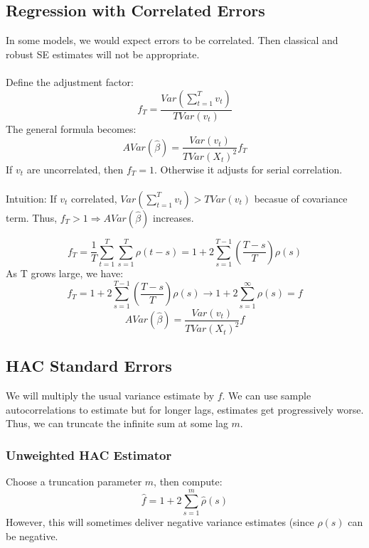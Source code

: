\documentclass{article}
\begin{document}
\subsection{Regression with Correlated Errors}
In some models, we would expect errors to be correlated. Then classical and robust SE estimates will not be appropriate.\\
\\
Define the adjustment factor:
$$f_T = \frac{Var(\sum_{t=1}^T v_t)}{TVar(v_t)}$$
The general formula becomes:
$$AVar(\hat{\beta}) = \frac{Var(v_t)}{TVar(X_t)^2}f_T$$
If $v_t$ are uncorrelated, then $f_T = 1$. Otherwise it adjusts for serial correlation.\\
\\
Intuition: If $v_t$ correlated, $Var(\sum_{t=1}^T v_t) > TVar(v_t)$ becasue of covariance term. Thus, $f_T > 1 \Rightarrow AVar(\hat{\beta})$ increases.

$$f_T = \frac{1}{T}\sum_{t=1}^T \sum_{s=1}^T \rho (t-s) = 1 + 2\sum_{s=1}^{T-1} (\frac{T-s}{T})\rho (s)$$
As T grows large, we have:
$$f_T = 1 + 2\sum_{s=1}^{T-1} (\frac{T-s}{T})\rho (s) \longrightarrow 1 + 2\sum_{s=1}^\infty \rho (s) = f$$
$$AVar(\hat{\beta}) = \frac{Var(v_t)}{TVar(X_t)^2}f$$

\subsection{HAC Standard Errors}
We will multiply the usual variance estimate by $f$. We can use sample autocorrelations to estimate but for longer lags, estimates get progressively worse. Thus, we can truncate the infinite sum at some lag $m$.

\subsubsection{Unweighted HAC Estimator}
Choose a truncation parameter $m$, then compute:
$$\hat{f} = 1 + 2\sum_{s=1}^m \hat{\rho} (s)$$
However, this will sometimes deliver negative variance estimates (since $\hat{\rho}(s)$ can be negative.
\end{document}

